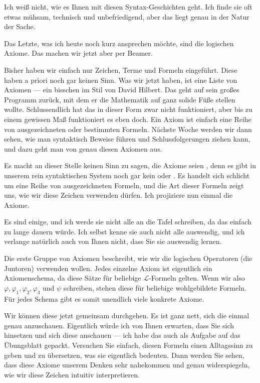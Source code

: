 \begin{spoken-clean}[01:19:22 - 01:22:52]
Ich weiß nicht, wie es Ihnen mit diesen Syntax-Geschichten geht. Ich finde sie oft etwas mühsam, technisch und unbefriedigend, aber das liegt genau in der Natur der Sache.

Das Letzte, was ich heute noch kurz ansprechen möchte, sind die logischen Axiome. Das machen wir jetzt aber per Beamer. 

Bisher haben wir einfach nur Zeichen, Terme und Formeln eingeführt. Diese haben a priori noch gar keinen Sinn. Was wir jetzt haben, ist eine Liste von Axiomen --- ein bisschen im Stil von David Hilbert. Das geht auf sein großes Programm zurück, mit dem er die Mathematik auf ganz solide Füße stellen wollte. Schlussendlich hat das in dieser Form zwar nicht funktioniert, aber bis zu einem gewissen Maß funktioniert es eben doch. Ein Axiom ist einfach eine Reihe von ausgezeichneten oder bestimmten Formeln. Nächste Woche werden wir dann sehen, wie man syntaktisch Beweise führen und Schlussfolgerungen ziehen kann, und dazu geht man von genau diesen Axiomen aus.

Es macht an dieser Stelle keinen Sinn zu sagen, die Axiome seien , denn es gibt in unserem rein syntaktischen System noch gar kein  oder . Es handelt sich schlicht um eine Reihe von ausgezeichneten Formeln, und die Art dieser Formeln zeigt uns, wie wir diese Zeichen verwenden dürfen. Ich projiziere nun einmal die Axiome.

Es sind einige, und ich werde sie nicht alle an die Tafel schreiben, da das einfach zu lange dauern würde. Ich selbst kenne sie auch nicht alle auswendig, und ich verlange natürlich auch von Ihnen nicht, dass Sie sie auswendig lernen.

Die erste Gruppe von Axiomen beschreibt, wie wir die logischen Operatoren (die Juntoren) verwenden wollen. Jedes einzelne Axiom ist eigentlich ein Axiomenschema, da diese Sätze für beliebige $\mathcal{L}$-Formeln gelten. Wenn wir also $\varphi, \varphi_1, \varphi_2, \varphi_3$ und $\psi$ schreiben, stehen diese für beliebige wohlgebildete Formeln. Für jedes Schema gibt es somit unendlich viele konkrete Axiome.

Wir können diese jetzt gemeinsam durchgehen. Es ist ganz nett, sich die einmal genau anzuschauen. Eigentlich würde ich von Ihnen erwarten, dass Sie sich hinsetzen und sich diese anschauen --- ich habe das auch als Aufgabe auf das Übungsblatt gepackt. Versuchen Sie einfach, diesen Formeln einen Alltagssinn zu geben und zu übersetzen, was sie eigentlich bedeuten. Dann werden Sie sehen, dass diese Axiome unserem Denken sehr nahekommen und genau widerspiegeln, wie wir diese Zeichen intuitiv interpretieren.
\end{spoken-clean}

